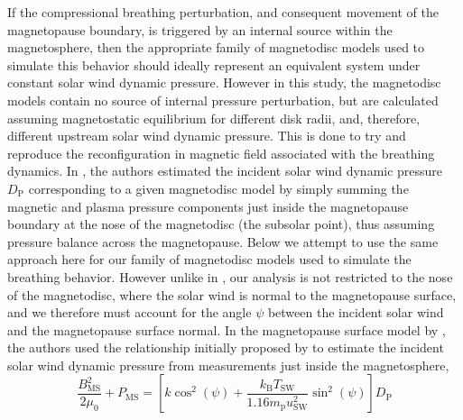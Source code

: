 If the compressional breathing perturbation, and consequent movement of the magnetopause boundary, is triggered by an internal source within the magnetosphere, then the appropriate family of magnetodisc models used to simulate this behavior should ideally represent an equivalent system under constant solar wind dynamic pressure. However in this study, the magnetodisc models contain no source of internal pressure perturbation, but are calculated assuming magnetostatic equilibrium for different disk radii, and, therefore, different upstream solar wind dynamic pressure. This is done to try and reproduce the reconfiguration in magnetic field associated with the breathing dynamics. In \citet{sorba2017}, the authors estimated the incident solar wind dynamic pressure $D_\mathrm{P}$ corresponding to a given magnetodisc model by simply summing the magnetic and plasma pressure components just inside the magnetopause boundary at the nose of the magnetodisc (the subsolar point), thus assuming pressure balance across the magnetopause. Below we attempt to use the same approach here for our family of magnetodisc models used to simulate the breathing behavior. However unlike in \citet{sorba2017}, our analysis is not restricted to the nose of the magnetodisc, where the solar wind is normal to the magnetopause surface, and we therefore must account for the angle $\psi$ between the incident solar wind and the magnetopause surface normal. In the magnetopause surface model by \citet{pilkington2015}, the authors used the relationship initially proposed by \citet{kanani2010} to estimate the incident solar wind dynamic pressure from measurements just inside the magnetosphere,
\begin{equation}\label{equinox:eq:pbalance}
\frac{B_\mathrm{MS}^2}{2\mu_0} + P_\mathrm{MS} = [k\cos^2(\psi) + \frac{k_\mathrm{B}T_\mathrm{SW}}{1.16m_\mathrm{p}u_\mathrm{SW}^2}\sin^2(\psi)] D_\mathrm{P}
\end{equation}
